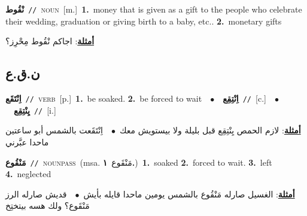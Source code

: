 \documentclass[10pt,a4paper,twoside]{article} %
\begin{document}
\begin{multicols}{2}
{\setlength\topsep{0pt}\textbf{\foreignlanguage{arabic}{نْقُوط}}\ {\color{gray}\texttt{//}\color{black}}\ \textsc{noun}\ [m.]\ \textbf{1.}~money that is given as a gift to the people who celebrate their wedding, graduation or giving birth to a baby, etc..  \textbf{2.}~monetary gifts\  \begin{flushright}\color{gray}\foreignlanguage{arabic}{\textbf{\underline{\foreignlanguage{arabic}{أمثلة}}}: اجاكم نْقُوط مِحْرِز؟}\end{flushright}\color{black}} \vspace{2mm}

\vspace{-3mm}
\subsection*{\color{blue}\foreignlanguage{arabic}{ن.ق.ع}\color{blue}{}} 

{\setlength\topsep{0pt}\textbf{\foreignlanguage{arabic}{اِنْتَقَع}}\ {\color{gray}\texttt{//}\color{black}}\ \textsc{verb}\ [p.]\ \textbf{1.}~be soaked.  \textbf{2.}~be forced to wait\ \ $\bullet$\ \ \setlength\topsep{0pt}\textbf{\foreignlanguage{arabic}{اِنْتِقِع}}\ {\color{gray}\texttt{//}\color{black}}\ [c.]\ \ $\bullet$\ \ \setlength\topsep{0pt}\textbf{\foreignlanguage{arabic}{يِنْتِقِع}}\ {\color{gray}\texttt{//}\color{black}}\ [i.]\  \begin{flushright}\color{gray}\foreignlanguage{arabic}{\textbf{\underline{\foreignlanguage{arabic}{أمثلة}}}: لازم الحمص يِنْتِقِع قبل بليلة ولا بيستويش معك\ $\bullet$\ \  اِنْتَقَعت بالشمس أبو ساعتين ماحدا عبَّرني}\end{flushright}\color{black}} \vspace{2mm}

{\setlength\topsep{0pt}\textbf{\foreignlanguage{arabic}{مَنْقُوع}}\ {\color{gray}\texttt{//}\color{black}}\ \textsc{noun\textunderscore pass}\ \color{gray}(msa. \foreignlanguage{arabic}{مَنْقَوع}~\foreignlanguage{arabic}{\textbf{١.}})\color{black}\ \textbf{1.}~soaked  \textbf{2.}~forced to wait.  \textbf{3.}~left  \textbf{4.}~neglected\  \begin{flushright}\color{gray}\foreignlanguage{arabic}{\textbf{\underline{\foreignlanguage{arabic}{أمثلة}}}: الغسيل صارله مَنْقُوع بالشمس يومين ماحدا قايله بأيش\ $\bullet$\ \  قديش صارله الرز مَنْقَوع؟ ولك هسه بيتختِخ}\end{flushright}\color{black}} \vspace{2mm}


\end{multicols}
\end{document}
